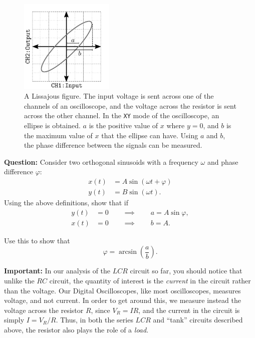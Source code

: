 \begin{figure}[!htb]
    \centering
    \includegraphics[width=0.4\textwidth]{figs/electronics-circuits/lissajous.png}
    \caption{A Lissajous figure. The input voltage is sent across one of the channels of an oscilloscope, and the voltage across the resistor is sent across the other channel. In the \texttt{XY} mode of the oscilloscope, an ellipse is obtained. $a$ is the positive value of $x$ where $y=0$, and $b$ is the maximum value of $x$ that the ellipse can have. Using $a$ and $b$, the phase difference between the signals can be measured. }
    \label{fig:lissajous}
\end{figure}

\begin{question}
    \textbf{Question:} Consider two orthogonal sinusoids with a frequency $\omega$ and phase difference $\varphi$:
    \begin{equation}
        \begin{aligned}
            x(t) &= A \sin(\omega t + \varphi)\\
            y(t) &= B \sin(\omega t).
        \end{aligned}
    \end{equation}
    Using the above definitions, show that if
    \begin{equation}
        \begin{aligned}
            y(t)&=0 \quad \quad \implies \quad \quad a = A \sin\varphi, \\
            x(t)&=0 \quad \quad \implies \quad \quad b = A.
        \end{aligned}
    \end{equation}

    Use this to show that 
    \begin{equation}
        \varphi = \arcsin\left(\frac{a}{b}\right).
    \end{equation}
\end{question}

\begin{imp}
    \textbf{Important:} In our analysis of the $LCR$ circuit so far, you should notice that unlike the $RC$ circuit, the quantity of interest is the \textsl{current} in the circuit rather than the voltage. Our Digital Oscilloscopes, like most oscilloscopes, measures voltage, and not current. In order to get around this, we measure instead the voltage across the resistor $R$, since $V_R = I R$, and the current in the circuit is simply $I = V_R/R$. Thus, in both the series $LCR$ and ``tank'' circuits described above, the resistor also plays the role of a \textsl{load}.
\end{imp}



